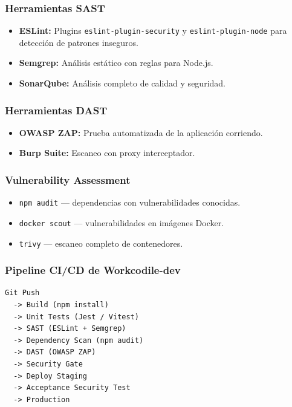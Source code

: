 \subsubsection{Herramientas SAST}
\begin{itemize}
    \item \textbf{ESLint:} Plugins \texttt{eslint-plugin-security} y \texttt{eslint-plugin-node} para detección de patrones inseguros.
    \item \textbf{Semgrep:} Análisis estático con reglas para Node.js.
    \item \textbf{SonarQube:} Análisis completo de calidad y seguridad.
\end{itemize}

\subsubsection{Herramientas DAST}
\begin{itemize}
    \item \textbf{OWASP ZAP:} Prueba automatizada de la aplicación corriendo.
    \item \textbf{Burp Suite:} Escaneo con proxy interceptador.
\end{itemize}

\subsubsection{Vulnerability Assessment}
\begin{itemize}
    \item \texttt{npm audit} --- dependencias con vulnerabilidades conocidas.
    \item \texttt{docker scout} --- vulnerabilidades en imágenes Docker.
    \item \texttt{trivy} --- escaneo completo de contenedores.
\end{itemize}

\subsubsection{Pipeline CI/CD de Workcodile-dev}

\begin{lstlisting}[caption={Pipeline CI/CD de Workcodile-dev}, basicstyle=\ttfamily\tiny, columns=fullflexible]
Git Push
  -> Build (npm install)
  -> Unit Tests (Jest / Vitest)
  -> SAST (ESLint + Semgrep)
  -> Dependency Scan (npm audit)
  -> DAST (OWASP ZAP)
  -> Security Gate
  -> Deploy Staging
  -> Acceptance Security Test
  -> Production
\end{lstlisting}

